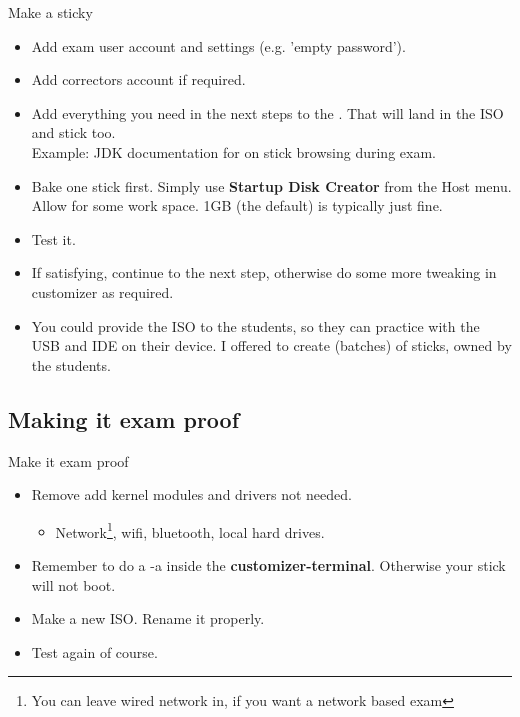 \begin{frame}{Make a sticky}
  \begin{itemize}
  \item Add exam user account and settings (e.g. 'empty password').
  \item Add correctors account if required.
  \item Add everything you need in the next steps to the
    . That will land in the ISO and stick too.\\
    Example: JDK documentation for on stick browsing during exam.
  \item Bake one stick first. Simply use \textbf{Startup Disk Creator} from the
    Host menu. Allow for some work space. 1GB (the default) is
    typically just fine.
  \item Test it.
  \item If satisfying, continue to the next step, otherwise do some more
    tweaking in customizer as required.
  \item You could provide the ISO to the students, so they can
    practice with the USB and IDE on their device. I offered to
    create (batches) of sticks, owned by the students.
  \end{itemize}
\end{frame}

\subsection[EXAM proof]{Making it exam proof}
\begin{frame}{Make it exam proof}
  \begin{itemize}
  \item Remove add kernel modules and drivers not needed.
    \begin{itemize}
    \item Network\footnote{You can leave wired network in, if you want
      a network based exam}, wifi, bluetooth, local hard drives.
    \end{itemize}
  \item Remember to do a  -a inside the
    \textbf{customizer-terminal}. Otherwise your stick will not boot.
  \item Make a new ISO. Rename it properly.
  \item Test again of course.
  \end{itemize}
\end{frame}

